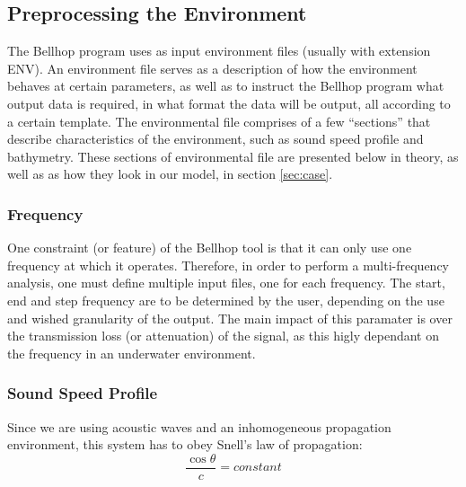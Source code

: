 \documentclass[a4paper]{IEEEtran}
\begin{document}
\subsection{Preprocessing the Environment}

The Bellhop program uses as input environment files (usually with extension
ENV). An environment file serves as a description of how the environment behaves
at certain parameters, as well as to instruct the Bellhop program what output
data is required, in what format the data will be output, all according to a
certain template. The environmental file comprises of a few ``sections'' that
describe characteristics of the environment, such as sound speed profile and
bathymetry. These sections of environmental file are presented below in theory,
as well as as how they look in our model, in section \ref{sec:case}.

\subsubsection{Frequency}
One constraint (or feature) of the Bellhop tool is that it can only use one
frequency at which it operates. Therefore, in order to perform a multi-frequency
analysis, one must define multiple input files, one for each frequency. The
start, end and step frequency are to be determined by the user, depending on the
use and wished granularity of the output. The main impact of this paramater is
over the transmission loss (or attenuation) of the signal, as this higly
dependant on the frequency in an underwater environment.

\subsubsection{Sound Speed Profile}
Since we are using acoustic waves and an inhomogeneous propagation environment,
this system has to obey Snell's law of propagation: $$ \frac{\cos{\theta}}{c} =
constant $$
\end{document}
